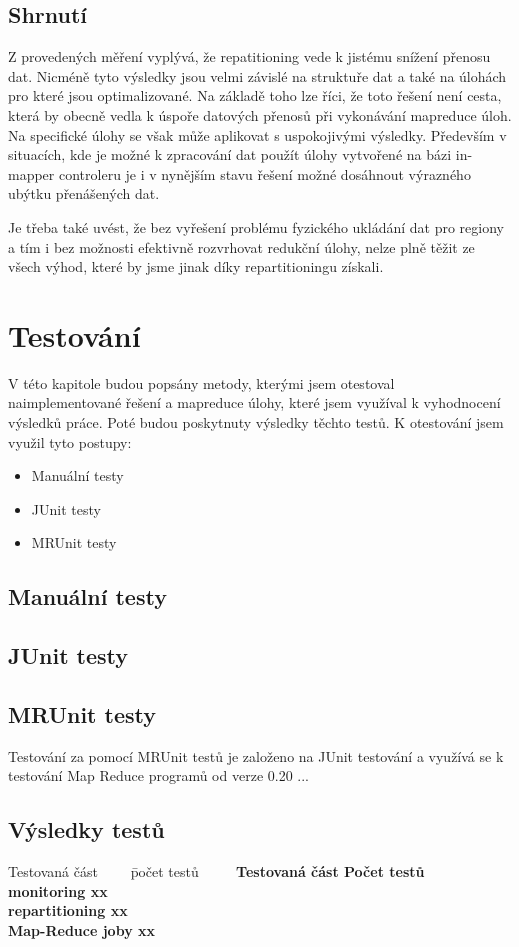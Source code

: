 \documentclass[thesis=M,czech]{FITthesis}[2012/06/26]
\begin{document}
\subsection{Shrnutí}
Z provedených měření vyplývá, že repatitioning vede k jistému snížení přenosu dat. Nicméně tyto výsledky jsou velmi závislé na struktuře dat a také na úlohách pro které jsou optimalizované. Na základě toho lze říci, že toto řešení není cesta, která by obecně vedla k úspoře datových přenosů při vykonávání mapreduce úloh. Na specifické úlohy se však může aplikovat s uspokojivými výsledky. Především v situacích, kde je možné k zpracování dat použít úlohy vytvořené na bázi in-mapper controleru je i v nynějším stavu řešení možné dosáhnout výrazného ubýtku přenášených dat.

Je třeba také uvést, že bez vyřešení problému fyzického ukládání dat pro regiony a tím i bez možnosti efektivně rozvrhovat redukční úlohy,  nelze plně těžit ze všech výhod, které by jsme jinak díky repartitioningu získali.




\section{Testování}
V této kapitole budou popsány metody, kterými jsem otestoval naimplementované řešení a mapreduce úlohy, které jsem využíval k vyhodnocení výsledků práce. Poté budou poskytnuty výsledky těchto testů.
K otestování jsem využil tyto postupy:
\begin{itemize}
	\item Manuální testy
	\item JUnit testy
	\item MRUnit testy
\end{itemize}

\subsection{Manuální testy}
\subsection{JUnit testy}
\subsection{MRUnit testy}
Testování za pomocí MRUnit testů je založeno na JUnit testování a využívá se k testování Map Reduce programů od verze 0.20 \cite{mrunit}... 
\subsection{Výsledky testů}
    \begin{tabbing}
    Testovaná část ~~~~\= počet testů ~~~~
     \kill
    \bfseries Testovaná část \>
    \bfseries Počet testů  
     \\[2mm]
    monitoring \> xx\\
    repartitioning\> xx \\
    Map-Reduce joby \> xx
    \end{tabbing}
\end{document}
